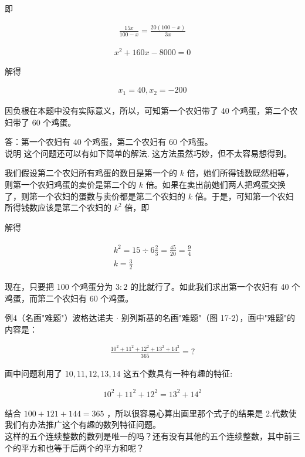 \documentclass[10pt]{article}
\begin{document}
即

\begin{align*}
\frac{15 x}{100-x}=\frac{20(100-x)}{3 x}
\end{align*}

\begin{align*}
x^{2}+160 x-8000=0
\end{align*}

解得

\begin{align*}
x_{1}=40, x_{2}=-200
\end{align*}

因负根在本题中没有实际意义，所以，可知第一个农妇带了 40 个鸡蛋，第二个农妇带了 60 个鸡蛋。

答：第一个农妇有 40 个鸡蛋，第二个农妇有 60 个鸡蛋。\\
说明 这个问题还可以有如下简单的解法. 这方法虽然巧妙，但不太容易想得到。

我们假设第二个农妇所有鸡蛋的数目是第一个的 $k$ 倍，她们所得钱数既然相等，则第一个农妇鸡蛋的卖价是第二个的 $k$ 倍。如果在卖出前她们两人把鸡蛋交换了，则第一个农妇的蛋数与卖价都是第二个农妇的 $k$ 倍。于是，可知第一个农妇所得钱数应该是第二个农妇的 $k^{2}$ 倍，即

解得

\begin{align*}
\begin{gathered}
k^{2}=15 \div 6 \frac{2}{3}=\frac{45}{20}=\frac{9}{4} \\
k=\frac{3}{2}
\end{gathered}
\end{align*}

现在，只要把 100 个鸡蛋分为 $3: 2$ 的比就行了。如此我们求出第一个农妇有 40 个鸡蛋，而第二个农妇有 60 个鸡蛋。

例4（名画"难题"）波格达诺夫 $\cdot$ 别列斯基的名画"难题"（图 17-2），画中"难题"的内容是：

\begin{align*}
\frac{10^{2}+11^{2}+12^{2}+13^{2}+14^{2}}{365}=?
\end{align*}

画中问题利用了 $10,11,12,13,14$ 这五个数具有一种有趣的特征:

\begin{align*}
10^{2}+11^{2}+12^{2}=13^{2}+14^{2}
\end{align*}

结合 $100+121+144=365$ ，所以很容易心算出画里那个式子的结果是 2.代数使我们有办法推广这个有趣的数列特征问题。\\
这样的五个连续整数的数列是唯一的吗？还有没有其他的五个连续整数，其中前三个的平方和也等于后两个的平方和呢？
\end{document}
